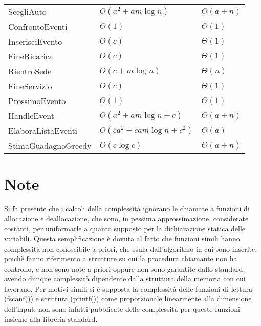 \documentclass[a4paper,11pt]{Article}
\newcommand\T{\rule{0pt}{2.6ex}}       %
\newcommand\B{\rule[-1.2ex]{0pt}{0pt}} %
\begin{document}
\begin{tabular}{p{3.8cm}p{4cm}p{4cm}}
ScegliAuto                      & $O(a^2 + am\log{n})$            & $\Theta(a + n)$ \T\\
ConfrontoEventi                 & $\Theta(1)$                     & $\Theta(1)$ \T\\
InserisciEvento                 & $O(c)$                          & $\Theta(1)$ \T\\
FineRicarica                    & $O(c)$                          & $\Theta(1)$ \T\\
RientroSede                     & $O(c + m\log{n})$               & $\Theta(n)$ \T\\
FineServizio                    & $O(c)$                          & $\Theta(1)$ \T\\
ProssimoEvento                  & $\Theta(1)$                     & $\Theta(1)$ \T\\
HandleEvent                     & $O(a^2 + am\log{n} + c)$        & $\Theta(a + n)$ \T\\
ElaboraListaEventi              & $O(ca^2 + cam\log{n} +c^2)$     & $\Theta(a)$ \T\\
StimaGuadagnoGreedy             & $O(c\log{c})$                   & $\Theta(a + n)$ \T\B\\
\end{tabular}




\section{Note}
Si fa presente che i calcoli della complessità ignorano le chiamate a funzioni di allocazione e deallocazione, che sono, in pessima approssimazione, considerate costanti, per uniformarle a quanto supposto per la dichiarazione statica delle variabili. Questa semplificazione è dovuta al fatto che funzioni simili hanno complessità non conoscibile a priori, che esula dall'algoritmo in cui sono inserite, poichè fanno riferimento a strutture su cui la procedura chiamante non ha controllo, e non sono note a priori oppure non sono garantite dallo standard, avendo dunque complessità dipendente dalla struttura della memoria con cui lavorano.
Per motivi simili si è supposta la complessità delle funzioni di lettura (fscanf()) e scrittura (printf()) come proporzionale linearmente alla dimensione dell'input: non sono infatti pubblicate delle complessità per queste funzioni insieme alla libreria standard.
\end{document}
